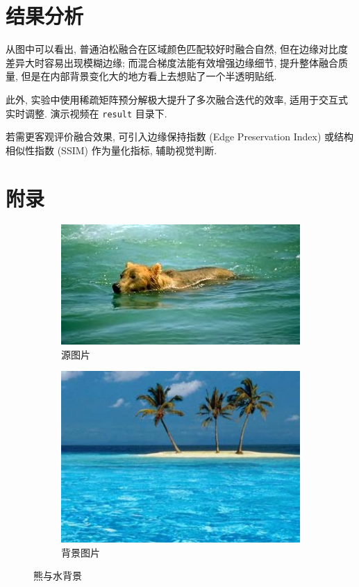 \documentclass[11pt,a4paper]{article}
\begin{document}
	\section{结果分析}
		从图中可以看出, 普通泊松融合在区域颜色匹配较好时融合自然, 但在边缘对比度差异大时容易出现模糊边缘; 而混合梯度法能有效增强边缘细节, 提升整体融合质量, 但是在内部背景变化大的地方看上去想贴了一个半透明贴纸.

		此外, 实验中使用稀疏矩阵预分解极大提升了多次融合迭代的效率, 适用于交互式实时调整. 演示视频在 \texttt{result} 目录下.

		若需更客观评价融合效果, 可引入边缘保持指数 (Edge Preservation Index) 或结构相似性指数 (SSIM) 作为量化指标, 辅助视觉判断.

	\newpage

	\section{附录}
		\begin{figure}[ht]
			\centering
			\begin{subfigure}[htbp]{0.45\textwidth}
				\includegraphics[width=\textwidth]{../../data/BearInWater.jpg}
				\caption{源图片}
			\end{subfigure}
			\begin{subfigure}[htbp]{0.36\textwidth}
				\includegraphics[width=\textwidth]{../../data/NewBackGround.jpg}
				\caption{背景图片}
			\end{subfigure}
			\caption{熊与水背景}
		\end{figure}
\end{document}
